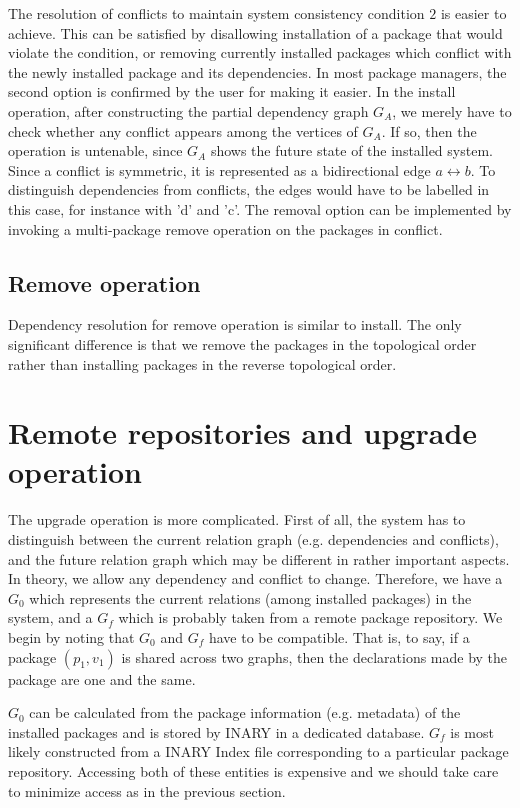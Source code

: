 \documentclass[a4paper,11pt]{article}
\begin{document}
The resolution of conflicts to maintain system consistency condition
$2$ is easier to achieve. This can be satisfied by disallowing
installation of a package that would violate the condition, or
removing currently installed packages which conflict with the newly
installed package and its dependencies. In most package managers, the
second option is confirmed by the user for making it easier. In the
install operation, after constructing the partial dependency graph
$G_A$, we merely have to check whether any conflict appears among the
vertices of $G_A$. If so, then the operation is untenable, since $G_A$
shows the future state of the installed system. Since a conflict is
symmetric, it is represented as a bidirectional edge $a \leftrightarrow b$. To
distinguish dependencies from conflicts, the edges would have to be
labelled in this case, for instance with 'd' and 'c'. The removal
option can be implemented by invoking a multi-package remove operation
on the packages in conflict.

\subsection{Remove operation}

Dependency resolution for remove operation is similar to install.  The
only significant difference is that we remove the packages in the
topological order rather than installing packages in the reverse
topological order.

\section{Remote repositories and upgrade operation}


The upgrade operation is more complicated. First of all, the system
has to distinguish between the current relation graph (e.g.
dependencies and conflicts), and the future relation graph which may
be different in rather important aspects. In theory, we allow any
dependency and conflict to change. Therefore, we have a $G_0$ which
represents the current relations (among installed packages) in the
system, and a $G_f$ which is probably taken from a remote package
repository. We begin by noting that $G_0$ and $G_f$ have to be
compatible. That is, to say, if a package $(p_1,v_1)$ is shared across
two graphs, then the declarations made by the package are one and the
same.

$G_0$ can be calculated from the package information (e.g. metadata)
of the installed packages and is stored by INARY in a dedicated
database. $G_f$ is most likely constructed from a INARY Index file
corresponding to a particular package repository. Accessing both of
these entities is expensive and we should take care to minimize access
as in the previous section.
\end{document}
